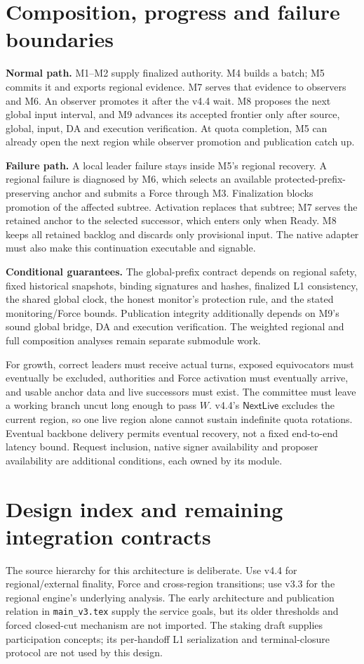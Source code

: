 \documentclass[11pt,a4paper]{article}
\newcommand{\api}[1]{\ensuremath{\mathsf{#1}}}
\begin{document}
\section{Composition, progress and failure boundaries}\label{sec:composition}
\textbf{Normal path.} M1--M2 supply finalized authority. M4 builds a
batch; M5 commits it and exports regional evidence. M7 serves that
evidence to observers and M6. An observer promotes it after the v4.4
wait. M8 proposes the next global input interval, and M9 advances its
accepted frontier only after source, global, input, DA and execution
verification. At quota completion, M5 can already open the next region
while observer promotion and publication catch up.

\textbf{Failure path.} A local leader failure stays inside M5's regional
recovery. A regional failure is diagnosed by M6, which selects an
available protected-prefix-preserving anchor and submits a Force through
M3. Finalization blocks promotion of the affected subtree. Activation
replaces that subtree; M7 serves the retained anchor to the selected
successor, which enters only when Ready. M8 keeps all retained backlog
and discards only provisional input. The native adapter must also make
this continuation executable and signable.

\textbf{Conditional guarantees.} The global-prefix contract depends on
regional safety, fixed historical snapshots, binding signatures and
hashes, finalized L1 consistency, the shared global clock, the honest
monitor's protection rule, and the stated monitoring/Force bounds.
Publication integrity additionally depends on M9's sound global bridge,
DA and execution verification. The weighted regional and full composition
analyses remain separate submodule work.

For growth, correct leaders must receive actual turns, exposed
equivocators must eventually be excluded, authorities and Force activation
must eventually arrive, and usable anchor data and live successors must
exist. The committee must leave a working branch uncut long enough to
pass $W$. v4.4's \api{NextLive} excludes the current region, so one live
region alone cannot sustain indefinite quota rotations. Eventual backbone
delivery permits eventual recovery, not a fixed end-to-end latency bound.
Request inclusion, native signer availability and proposer availability
are additional conditions, each owned by its module.

\section{Design index and remaining integration contracts}\label{sec:index}
The source hierarchy for this architecture is deliberate. Use v4.4 for
regional/external finality, Force and cross-region transitions; use v3.3
for the regional engine's underlying analysis. The early architecture
and publication relation in \texttt{main\_v3.tex} supply the service goals,
but its older thresholds and forced closed-cut mechanism are not imported.
The staking draft supplies participation concepts; its per-handoff L1
serialization and terminal-closure protocol are not used by this design.
\end{document}

